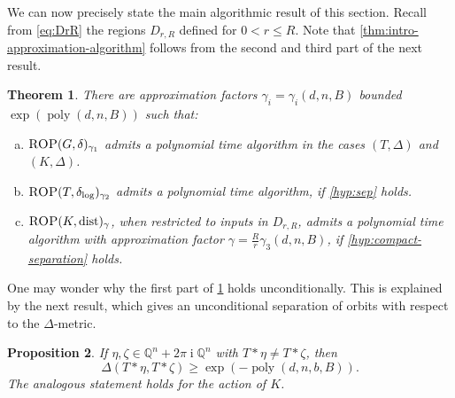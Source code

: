 \documentclass[10pt,a4paper]{article}
\newtheorem{theorem}{Theorem}[section]
\newtheorem{proposition}[theorem]{Proposition}
\theoremstyle{definition}
\newenvironment{alphaenumerate}{\begin{enumerate}[(a)]}{\end{enumerate}}
\DeclareMathOperator{\poly}{poly}
\DeclareMathOperator{\ii}{i}
\DeclareMathOperator{\dist}{dist}
\newcommand{\distLD}{\delta_{\log}}
\newcommand{\QQ}{\mathbb{Q}}
\numberwithin{equation}{section}
\begin{document}
We can now precisely state the main algorithmic result of this section.
Recall from \cref{eq:DrR} the regions $D_{r, R}$ defined for $0<r\leq R$.
Note that \cref{thm:intro-approximation-algorithm} follows from
the second and third part of the next result.

\begin{theorem}
\label{thm:gap-algorithms-main}
There are approximation factors $\gamma_i=\gamma_i(d,n,B)$
bounded $\exp(\poly(d,n,B))$ such that:
\begin{alphaenumerate}
\item\label{it:gap 3}
$\textsc{ROP}(G,\delta)_{\gamma_1}$ admits a polynomial time algorithm
in the cases $(T, \Delta)$ and $(K, \Delta)$.

\item\label{it:gap 1}
$\textsc{ROP}(T,\distLD)_{\gamma_2}$
admits a polynomial time algorithm,
if \cref{hyp:sep} holds.

\item\label{it:gap 2}
$\textsc{ROP}(K,\dist)_{\gamma}$, when restricted to inputs in $D_{r,R}$,
admits a polynomial time algorithm with
approximation factor $\gamma= \frac{R}{r}\gamma_3(d,n,B)$,
if \cref{hyp:compact-separation} holds.

\end{alphaenumerate}
\end{theorem}

One may wonder why the first part of \cref{thm:gap-algorithms-main}
holds unconditionally. This is explained by the next result, which
gives an unconditional separation of orbits with respect to
the $\Delta$-metric.

\begin{proposition}
\label{prop:logarithmic-separation}
If $\eta,\zeta\in\QQ^n+2\pi\ii\QQ^n$ with
$T\ast\eta\neq T\ast\zeta$, then
\[
 \Delta(T\ast\eta, T\ast\zeta) \ge \exp(-\poly(d,n,b,B)) .
\]
The analogous statement holds for the action of $K$.
\end{proposition}
\end{document}
